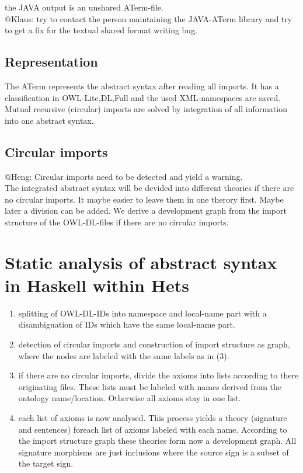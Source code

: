 \documentclass[11pt,a4paper]{article}
\begin{document}
   the JAVA output is an unshared ATerm-file.\\

   @Klaus: try to contact the person maintaining the JAVA-ATerm
   library and try to get a fix for the textual shared format writing
   bug. 

\subsection{Representation}
The ATerm represents the abstract syntax after reading all
   imports. It has a classification in OWL-{Lite,DL,Full} and the used
   XML-namespaces are saved. Mutual recursive (circular) imports are
   solved by integration of all information into one abstract syntax.

\subsection{Circular imports} 

   @Heng: Circular imports need to be detected and yield a
   warning.\\
   
The integrated abstract syntax will be devided into different
   theories if there are no circular imports. It maybe easier to leave
   them in one therory first. Maybe later a division can be added.
   We derive a development graph from the import structure of the 
   OWL-DL-files if there are no circular imports.

\section{Static analysis of abstract syntax in Haskell within Hets}
   \begin{enumerate}
   \item splitting of OWL-DL-IDs into namespace and local-name part
       with a disambiguation of IDs which have the same local-name
       part.

   \item detection of circular imports and construction of import
       structure as graph, where the nodes are labeled with the same
       labels as in (3).

   \item if there are no circular imports, divide the axioms into lists
       according to there originating files. These lists must be
       labeled with names derived from the ontology name/location.
       Otherwise all axioms stay in one list.

   \item each list of axioms is now analysed. This process yields a
       theory (signature and sentences) foreach list of axioms labeled
       with each name. According to the import structure graph these
       theories form now a development graph. All signature morphisms
       are just inclusions where the source sign is a subset of the
       target sign.
   \end{enumerate}
\end{document}

